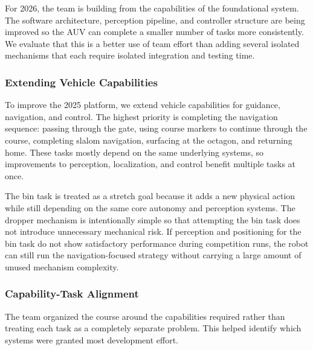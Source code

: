 \documentclass[conference]{IEEEtran}
\begin{document}
For 2026, the team is building from the capabilities of the foundational system. The software architecture, perception pipeline, and controller structure are being improved so the AUV can complete a smaller number of tasks more consistently. We evaluate that this is a better use of team effort than adding several isolated mechanisms that each require isolated integration and testing time.

\subsubsection{Extending Vehicle Capabilities}

To improve the 2025 platform, we extend vehicle capabilities for guidance, navigation, and control. The highest priority is completing the navigation sequence: passing through the gate, using course markers to continue through the course, completing slalom navigation, surfacing at the octagon, and returning home. These tasks mostly depend on the same underlying systems, so improvements to perception, localization, and control benefit multiple tasks at once.

The bin task is treated as a stretch goal because it adds a new physical action while still depending on the same core autonomy and perception systems. The dropper mechanism is intentionally simple so that attempting the bin task does not introduce unnecessary mechanical risk. If perception and positioning for the bin task do not show satisfactory performance during competition runs, the robot can still run the navigation-focused strategy without carrying a large amount of unused mechanism complexity.

\subsubsection{Capability-Task Alignment}

The team organized the course around the capabilities required rather than treating each task as a completely separate problem. This helped identify which systems were granted most development effort.
\end{document}
